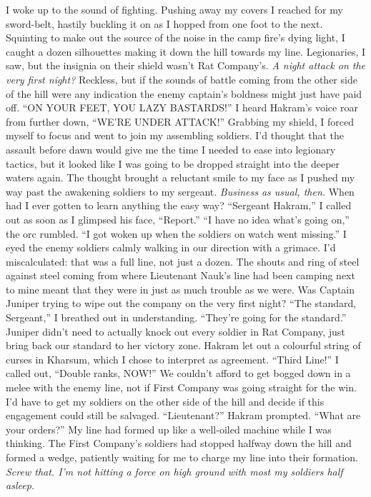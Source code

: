 \documentclass[12pt, openany]{book}
\begin{document}
I woke up to the sound of fighting.
Pushing away my covers I reached for my sword-belt, hastily buckling it on as I hopped from one foot to the next. Squinting to make out the source of the noise in the camp fire’s dying light, I caught a dozen silhouettes making it down the hill towards my line. Legionaries, I saw, but the insignia on their shield wasn’t Rat Company’s. \textit{A night attack on the very first night?} Reckless, but if the sounds of battle coming from the other side of the hill were any indication the enemy captain’s boldness might just have paid off.
“ON YOUR FEET, YOU LAZY BASTARDS!” I heard Hakram’s voice roar from further down, “WE’RE UNDER ATTACK!”
Grabbing my shield, I forced myself to focus and went to join my assembling soldiers. I’d thought that the assault before dawn would give me the time I needed to ease into legionary tactics, but it looked like I was going to be dropped straight into the deeper waters again. The thought brought a reluctant smile to my face as I pushed my way past the awakening soldiers to my sergeant. \textit{Business as usual, then.} When had I ever gotten to learn anything the easy way?
“Sergeant Hakram,” I called out as soon as I glimpsed his face, “Report.”
“I have no idea what’s going on,” the orc rumbled. “I got woken up when the soldiers on watch went missing.”
I eyed the enemy soldiers calmly walking in our direction with a grimace. I’d miscalculated: that was a full line, not just a dozen. The shouts and ring of steel against steel coming from where Lieutenant Nauk’s line had been camping next to mine meant that they were in just as much trouble as we were. Was Captain Juniper trying to wipe out the company on the very first night?
“The standard, Sergeant,” I breathed out in understanding. “They’re going for the standard.”
Juniper didn’t need to actually knock out every soldier in Rat Company, just bring back our standard to her victory zone. Hakram let out a colourful string of curses in Kharsum, which I chose to interpret as agreement.
“Third Line!” I called out, “Double ranks, NOW!”
We couldn’t afford to get bogged down in a melee with the enemy line, not if First Company was going straight for the win. I’d have to get my soldiers on the other side of the hill and decide if this engagement could still be salvaged.
“Lieutenant?” Hakram prompted. “What are your orders?”
My line had formed up like a well-oiled machine while I was thinking. The First Company’s soldiers had stopped halfway down the hill and formed a wedge, patiently waiting for me to charge my line into their formation. \textit{Screw that. I’m not hitting a force on high ground with most my soldiers half asleep.}
\end{document}
